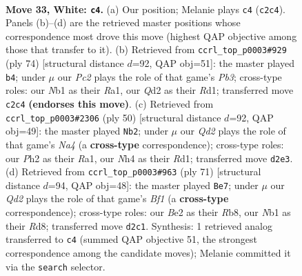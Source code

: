 \documentclass[11pt]{article}
\begin{document}
\begin{figure}[p]
\label{fig:thought-m62}
\end{figure}

\clearpage

\begin{figure}[p]\centering
\begin{subfigure}{0.46\textwidth}\centering
\resizebox{\linewidth}{!}{%
\newchessgame
\chessboard[
  setfen={rnb5/1p4kr/2pqp3/p2p1p1p/Pn1P1P1N/6P1/1PPQB1KP/1N2R2R w - - 19 33},
  showmover=false,
  pgfstyle=straightmove, color=movearrow, markmove={c2-c4}
]}
\caption{}
\end{subfigure}\hfill
\begin{subfigure}{0.46\textwidth}\centering
\resizebox{\linewidth}{!}{%
\newchessgame
\chessboard[
  setfen={1r6/2q2pbk/4r1pp/Npp1p2n/3nP3/1PP1B2P/1Q3PP1/R2R1NK1 w - - 2 38},
  showmover=false,
  pgfstyle=straightmove, color=movearrow, markmove={b3-b4}
]}
\caption{}
\end{subfigure}
\\[4pt]
\begin{subfigure}{0.46\textwidth}\centering
\resizebox{\linewidth}{!}{%
\newchessgame
\chessboard[
  setfen={r4r2/p1qn1p1k/1pp1b1pp/P3p3/NP2P3/4Q2P/2P1BPP1/R2R2K1 w - - 0 26},
  showmover=false,
  pgfstyle=straightmove, color=movearrow, markmove={a4-b2}
]}
\caption{}
\end{subfigure}\hfill
\begin{subfigure}{0.46\textwidth}\centering
\resizebox{\linewidth}{!}{%
\newchessgame
\chessboard[
  setfen={1r1rqbk1/1p1n1pp1/2p1p2p/p1N5/P2PP2P/1P2QNP1/2R2PK1/2R5 b - - 0 36},
  showmover=false,
  pgfstyle=straightmove, color=movearrow, markmove={f8-e7}
]}
\caption{}
\end{subfigure}
\caption{\textbf{Move 33, White: \texttt{c4}.} (a) Our position; Melanie plays \texttt{c4} (\texttt{c2c4}). Panels (b)--(d) are the retrieved master positions whose correspondence most drove this move (highest QAP objective among those that transfer to it). (b) Retrieved from \texttt{ccrl\_top\_p0003\#929} (ply 74) [structural distance $d$=92, QAP obj=51]: the master played \texttt{b4}; under $\mu$ our \emph{Pc2} plays the role of that game's \emph{Pb3}; cross-type roles: our \emph{N}b1 as their \emph{R}a1, our \emph{Q}d2 as their \emph{R}d1; transferred move \texttt{c2c4} \textbf{(endorses this move)}. (c) Retrieved from \texttt{ccrl\_top\_p0003\#2306} (ply 50) [structural distance $d$=92, QAP obj=49]: the master played \texttt{Nb2}; under $\mu$ our \emph{Qd2} plays the role of that game's \emph{Na4} (a \textbf{cross-type} correspondence); cross-type roles: our \emph{P}h2 as their \emph{R}a1, our \emph{N}h4 as their \emph{R}d1; transferred move \texttt{d2e3}. (d) Retrieved from \texttt{ccrl\_top\_p0003\#963} (ply 71) [structural distance $d$=94, QAP obj=48]: the master played \texttt{Be7}; under $\mu$ our \emph{Qd2} plays the role of that game's \emph{Bf1} (a \textbf{cross-type} correspondence); cross-type roles: our \emph{B}e2 as their \emph{R}b8, our \emph{N}b1 as their \emph{R}d8; transferred move \texttt{d2c1}. Synthesis: 1 retrieved analog transferred to \texttt{c4} (summed QAP objective 51, the strongest correspondence among the candidate moves); Melanie committed it via the \texttt{search} selector.}

\end{figure}
\end{document}
